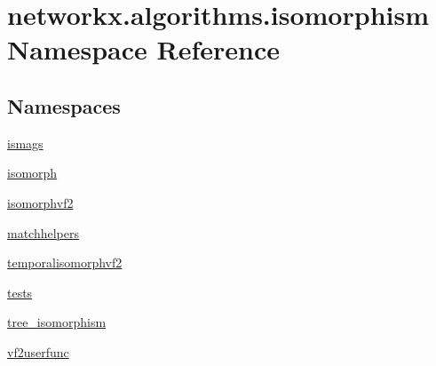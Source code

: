 \hypertarget{namespacenetworkx_1_1algorithms_1_1isomorphism}{}\section{networkx.\+algorithms.\+isomorphism Namespace Reference}
\label{namespacenetworkx_1_1algorithms_1_1isomorphism}
\subsection*{Namespaces}
\begin{DoxyCompactItemize}
\item 
 \hyperlink{namespacenetworkx_1_1algorithms_1_1isomorphism_1_1ismags}{ismags}
\item 
 \hyperlink{namespacenetworkx_1_1algorithms_1_1isomorphism_1_1isomorph}{isomorph}
\item 
 \hyperlink{namespacenetworkx_1_1algorithms_1_1isomorphism_1_1isomorphvf2}{isomorphvf2}
\item 
 \hyperlink{namespacenetworkx_1_1algorithms_1_1isomorphism_1_1matchhelpers}{matchhelpers}
\item 
 \hyperlink{namespacenetworkx_1_1algorithms_1_1isomorphism_1_1temporalisomorphvf2}{temporalisomorphvf2}
\item 
 \hyperlink{namespacenetworkx_1_1algorithms_1_1isomorphism_1_1tests}{tests}
\item 
 \hyperlink{namespacenetworkx_1_1algorithms_1_1isomorphism_1_1tree__isomorphism}{tree\+\_\+isomorphism}
\item 
 \hyperlink{namespacenetworkx_1_1algorithms_1_1isomorphism_1_1vf2userfunc}{vf2userfunc}
\end{DoxyCompactItemize}
